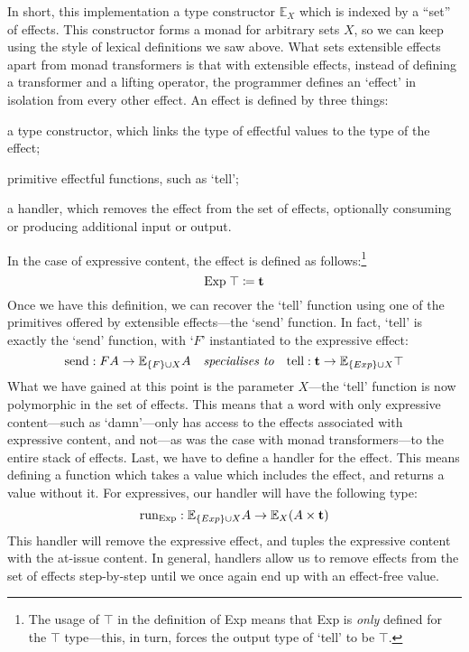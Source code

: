 In short, this implementation a type constructor $\mathbb{E}_X$ which
is indexed by a ``set'' of effects. This constructor forms a monad for
arbitrary sets $X$, so we can keep using the style of lexical
definitions we saw above.
What sets extensible effects apart from monad transformers is that
with extensible effects, instead of defining a transformer and a
lifting operator, the programmer defines an `effect' in isolation from
every other effect. An effect is defined by three things:
\begin{enumerate*}[label=\arabic*)]
\item a type constructor, which links the type of effectful values to
  the type of the effect;
\item primitive effectful functions, such as `tell';
\item a handler, which removes the effect from the set of effects,
  optionally consuming or producing additional input or output.
\end{enumerate*}
In the case of expressive content, the effect is
defined as follows:\footnote{%
  The usage of $\top$ in the definition of Exp means that Exp is
  \emph{only} defined for the $\top$ type---this, in turn, forces the
  output type of `tell' to be $\top$.
}
\[
  \text{Exp}\;\top\coloneqq\mathbf{t}
\]
Once we have this definition, we can recover the `tell' function using
one of the primitives offered by extensible effects---the `send'
function. In fact, `tell' is exactly the `send' function, with `$F$'
instantiated to the expressive effect:
\[
  \text{send} : FA\rightarrow\mathbb{E}_{\{F\}\cup X}A
  \quad
  \textit{specialises to}
  \quad
  \text{tell} : \mathbf{t}\rightarrow\mathbb{E}_{\{Exp\}\cup X}\top
\]
What we have gained at this point is the parameter $X$---the `tell'
function is now polymorphic in the set of effects. This means that a
word with only expressive content---such as `damn'---only has access
to the effects associated with expressive content, and not---as was
the case with monad transformers---to the entire stack of effects.
Last, we have to define a handler for the effect. This means defining
a function which takes a value which includes the effect, and returns
a value without it. For expressives, our handler will have the
following type:
\[
  \text{run}_{\text{Exp}} : \mathbb{E}_{\{Exp\}\cup X}A\rightarrow\mathbb{E}_{X}(A\times\mathbf{t})
\]
This handler will remove the expressive effect, and tuples the
expressive content with the at-issue content. In general, handlers
allow us to remove effects from the set of effects step-by-step until
we once again end up with an effect-free value.

